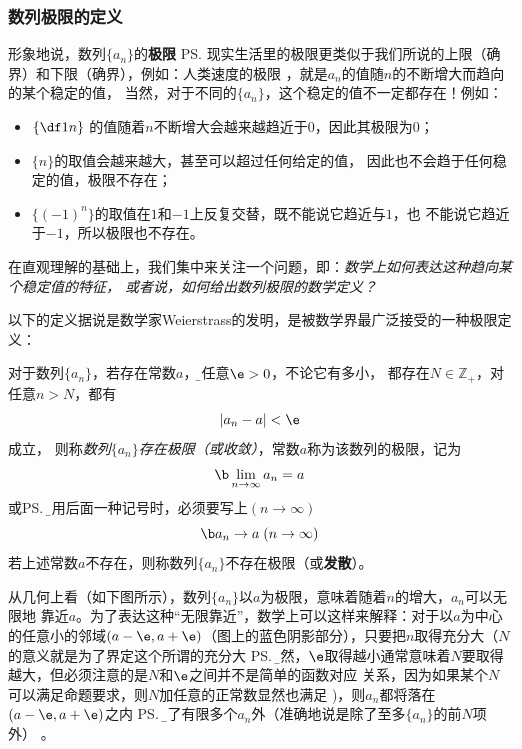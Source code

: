 \subsubsection{数列极限的定义}

形象地说，数列$\{a_n\}$的{\bf 极限}
\ps{现实生活里的极限更类似于我们所说的上限（确界）和下限（确界），例如：人类速度的极限}
，就是$a_n$的值随$n$的不断增大而趋向的某个稳定的值，
当然，对于不同的$\{a_n\}$，这个稳定的值不一定都存在！例如：
\begin{itemize}
  \item $\left\{\df1n\right\}$
  的值随着$n$不断增大会越来越趋近于$0$，因此其极限为$0$；
  \item $\{n\}$的取值会越来越大，甚至可以超过任何给定的值，
  因此也不会趋于任何稳定的值，极限不存在；
  \item $\{(-1)^n\}$的取值在$1$和$-1$上反复交替，既不能说它趋近与$1$，也
  不能说它趋近于$-1$，所以极限也不存在。
\end{itemize}

在直观理解的基础上，我们集中来关注一个问题，即：{\it 数学上如何表达这种趋向某个稳定值的特征，
或者说，如何给出数列极限的数学定义？}

以下的定义据说是数学家Weierstrass的发明，是被数学界最广泛接受的一种极限定义：

对于数列$\{a_n\}$，若存在常数$a$，{\b 对任意$\e>0$，不论它有多小，
都存在$N\in\mathbb{Z}_+$，对任意$n>N$，都有
$$|a_n-a|<\e$$
成立}，
则称{\it 数列$\{a_n\}$存在极限（或收敛）}，常数$a$称为该数列的极限，记为
$$\b\lim_{n\to\infty}a_n=a$$
或\ps{\b 使用后面一种记号时，必须要写上$(n\to\infty)$}
$$\b a_n\to a\;(n\to\infty)$$
若上述常数$a$不存在，则称数列$\{a_n\}$不存在极限（或{\bf 发散}）。

从几何上看（如下图所示），数列$\{a_n\}$以$a$为极限，意味着随着$n$的增大，$a_n$可以无限地
靠近$a$。为了表达这种“无限靠近”，数学上可以这样来解释：对于以$a$为中心的任意小的邻域$(a-\e,
a+\e)$（图上的蓝色阴影部分），只要把$n$取得充分大（$N$的意义就是为了界定这个所谓的充分大
\ps{\b 显然，$\e$取得越小通常意味着$N$要取得越大，但必须注意的是$N$和$\e$之间并不是简单的函数对应
关系，因为如果某个$N$可以满足命题要求，则$N$加任意的正常数显然也满足}
)，则$a_n$都将落在$(a-\e,a+\e)$之内
\ps{\b 除了有限多个$a_n$外（准确地说是除了至多$\{a_n\}$的前$N$项外）}
。

